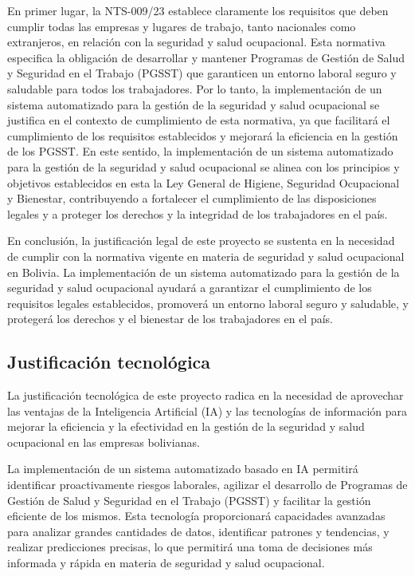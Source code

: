 En primer lugar, la NTS-009/23 establece claramente los requisitos que deben cumplir todas las empresas y lugares de trabajo, tanto nacionales como extranjeros, en relación con la seguridad y salud ocupacional. Esta normativa especifica la obligación de desarrollar y mantener Programas de Gestión de Salud y Seguridad en el Trabajo (PGSST) que garanticen un entorno laboral seguro y saludable para todos los trabajadores. Por lo tanto, la implementación de un sistema automatizado para la gestión de la seguridad y salud ocupacional se justifica en el contexto de cumplimiento de esta normativa, ya que facilitará el cumplimiento de los requisitos establecidos y mejorará la eficiencia en la gestión de los PGSST. En este sentido, la implementación de un sistema automatizado para la gestión de la seguridad y salud ocupacional se alinea con los principios y objetivos establecidos en esta la Ley General de Higiene, Seguridad Ocupacional y Bienestar, contribuyendo a fortalecer el cumplimiento de las disposiciones legales y a proteger los derechos y la integridad de los trabajadores en el país.

En conclusión, la justificación legal de este proyecto se sustenta en la necesidad de cumplir con la normativa vigente en materia de seguridad y salud ocupacional en Bolivia. La implementación de un sistema automatizado para la gestión de la seguridad y salud ocupacional ayudará a garantizar el cumplimiento de los requisitos legales establecidos, promoverá un entorno laboral seguro y saludable, y protegerá los derechos y el bienestar de los trabajadores en el país.

\subsection{Justificación tecnológica}

La justificación tecnológica de este proyecto radica en la necesidad de aprovechar las ventajas de la Inteligencia Artificial (IA) y las tecnologías de información para mejorar la eficiencia y la efectividad en la gestión de la seguridad y salud ocupacional en las empresas bolivianas.

La implementación de un sistema automatizado basado en IA permitirá identificar proactivamente riesgos laborales, agilizar el desarrollo de Programas de Gestión de Salud y Seguridad en el Trabajo (PGSST) y facilitar la gestión eficiente de los mismos. Esta tecnología proporcionará capacidades avanzadas para analizar grandes cantidades de datos, identificar patrones y tendencias, y realizar predicciones precisas, lo que permitirá una toma de decisiones más informada y rápida en materia de seguridad y salud ocupacional.

